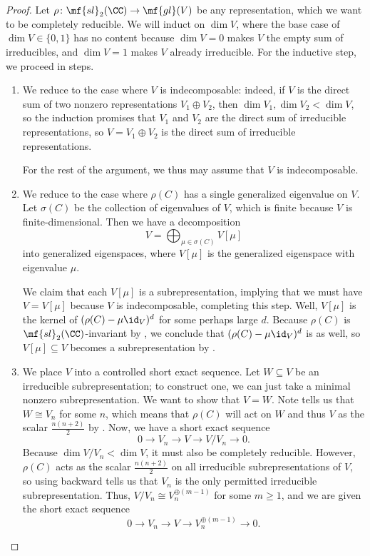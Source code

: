 \documentclass[../notes.tex]{subfiles}
\begin{document}
\begin{proof}
	Let $\rho\colon\mf{sl}_2(\CC)\to\mf{gl}(V)$ be any representation, which we want to be completely reducible. We will induct on $\dim V$, where the base case of $\dim V\in\{0,1\}$ has no content because $\dim V=0$ makes $V$ the empty sum of irreducibles, and $\dim V=1$ makes $V$ already irreducible. For the inductive step, we proceed in steps.
	\begin{enumerate}
		\item We reduce to the case where $V$ is indecomposable: indeed, if $V$ is the direct sum of two nonzero representations $V_1\oplus V_2$, then $\dim V_1,\dim V_2<\dim V$, so the induction promises that $V_1$ and $V_2$ are the direct sum of irreducible representations, so $V=V_1\oplus V_2$ is the direct sum of irreducible representations.

		For the rest of the argument, we thus may assume that $V$ is indecomposable.

		\item We reduce to the case where $\rho(C)$ has a single generalized eigenvalue on $V$. Let $\sigma(C)$ be the collection of eigenvalues of $V$, which is finite because $V$ is finite-dimensional. Then we have a decomposition
		\[V=\bigoplus_{\mu\in\sigma(C)}V[\mu]\]
		into generalized eigenspaces, where $V[\mu]$ is the generalized eigenspace with eigenvalue $\mu$.
		
		We claim that each $V[\mu]$ is a subrepresentation, implying that we must have $V=V[\mu]$ because $V$ is indecomposable, completing this step. Well, $V[\mu]$ is the kernel of $(\rho(C)-\mu{\id_V})^d$ for some perhaps large $d$. Because $\rho(C)$ is $\mf{sl}_2(\CC)$-invariant by , we conclude that $(\rho(C)-\mu{\id_V})^d$ is as well, so $V[\mu]\subseteq V$ becomes a subrepresentation by .

		\item We place $V$ into a controlled short exact sequence. Let $W\subseteq V$ be an irreducible subrepresentation; to construct one, we can just take a minimal nonzero subrepresentation. We want to show that $V=W$. Note  tells us that $W\cong V_n$ for some $n$, which means that $\rho(C)$ will act on $W$ and thus $V$ as the scalar $\frac{n(n+2)}2$ by . Now, we have a short exact sequence
		\[0\to V_n\to V\to V/V_n\to0.\]
		Because $\dim V/V_n<\dim V$, it must also be completely reducible. However, $\rho(C)$ acts as the scalar $\frac{n(n+2)}2$ on all irreducible subrepresentations of $V$, so using  backward tells us that $V_n$ is the only permitted irreducible subrepresentation. Thus, $V/V_n\cong V_n^{\oplus(m-1)}$ for some $m\ge1$, and we are given the short exact sequence
		\begin{equation}
			0\to V_n\to V\to V_n^{\oplus(m-1)}\to0. \label{eq:sl2-decompose-ses}
		\end{equation}


\end{enumerate}
\end{proof}
\end{document}
